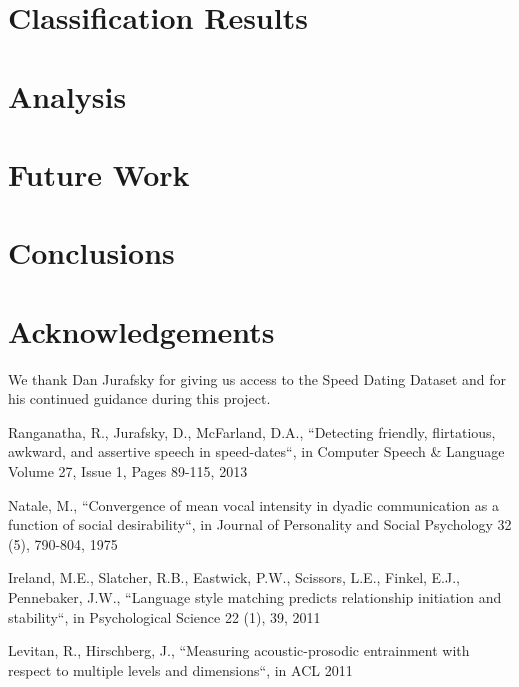 \documentclass[a4paper]{article}
\begin{document}
\section{Classification Results}

\section{Analysis}


\section{Future Work}


\section{Conclusions}


\section{Acknowledgements}
We thank Dan Jurafsky for giving us access to the Speed Dating Dataset and for his continued guidance during this project.

\newpage
%
\eightpt

\begin{thebibliography}{10}

Ranganatha, R., Jurafsky, D., McFarland, D.A., ``Detecting friendly, flirtatious, awkward, and assertive speech in speed-dates``, in Computer Speech \& Language
Volume 27, Issue 1, Pages 89-115, 2013

Natale, M.,  ``Convergence of mean vocal intensity in dyadic communication as a function of social desirability``, in Journal of Personality and
Social Psychology 32 (5), 790-804, 1975

Ireland, M.E., Slatcher, R.B., Eastwick, P.W., Scissors, L.E., Finkel, E.J., Pennebaker, J.W., ``Language style matching predicts relationship
initiation and stability``, in Psychological Science 22 (1), 39, 2011

Levitan, R., Hirschberg, J., ``Measuring acoustic-prosodic entrainment with respect to multiple levels and dimensions``, in ACL 2011

\end{thebibliography}
\end{document}

